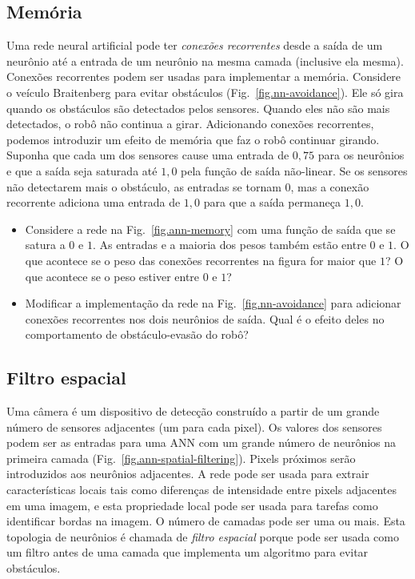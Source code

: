 \subsection{Memória}\label{s.ann-memory}

Uma rede neural artificial pode ter \emph{conexões recorrentes} desde a saída de um neurônio até a entrada de um neurônio na mesma camada (inclusive ela mesma). Conexões recorrentes podem ser usadas para implementar a memória. Considere o veículo Braitenberg para evitar obstáculos (Fig.~\ref{fig.nn-avoidance}). Ele só gira quando os obstáculos são detectados pelos sensores. Quando eles não são mais detectados, o robô não continua a girar. Adicionando conexões recorrentes, podemos introduzir um efeito de memória que faz o robô continuar girando. Suponha que cada um dos sensores cause uma entrada de $0,75$ para os neurônios e que a saída seja saturada até $1,0$ pela função de saída não-linear. Se os sensores não detectarem mais o obstáculo, as entradas se tornam $0$, mas a conexão recorrente adiciona uma entrada de $1,0$ para que a saída permaneça $1,0$.

\begin{framed}
\begin{itemize}
\item Considere a rede na Fig.~\ref{fig.ann-memory} com uma função de saída que se satura a $0$ e $1$. As entradas e a maioria dos pesos também estão entre $0$ e $1$. O que acontece se o peso das conexões recorrentes na figura for maior que $1$? O que acontece se o peso estiver entre $0$ e $1$?
\item Modificar a implementação da rede na Fig.~\ref{fig.nn-avoidance} para adicionar conexões recorrentes nos dois neurônios de saída. Qual é o efeito deles no comportamento de obstáculo-evasão do robô?
\end{itemize}
\end{framed}

\subsection{Filtro espacial}

Uma câmera é um dispositivo de detecção construído a partir de um grande número de sensores adjacentes (um para cada pixel). Os valores dos sensores podem ser as entradas para uma ANN com um grande número de neurônios na primeira camada (Fig.~\ref{fig.ann-spatial-filtering}). Pixels próximos serão introduzidos aos neurônios adjacentes. A rede pode ser usada para extrair características locais tais como diferenças de intensidade entre pixels adjacentes em uma imagem, e esta propriedade local pode ser usada para tarefas como identificar bordas na imagem. O número de camadas pode ser uma ou mais. Esta topologia de neurônios é chamada de \emph{filtro espacial} porque pode ser usada como um filtro antes de uma camada que implementa um algoritmo para evitar obstáculos.

